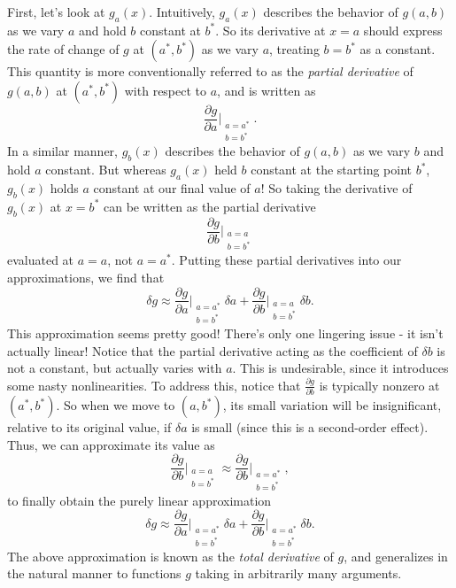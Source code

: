 \documentclass[letterpaper]{article}
\theoremstyle{remark}
\begin{document}
First, let's look at $g_a(x)$. Intuitively, $g_a(x)$ describes the behavior of $g(a, b)$ as we vary $a$ and hold $b$ constant at $b^*$. So its derivative at $x = a$ should express the rate of change of $g$ at $(a^*, b^*)$ as we vary $a$, treating $b = b^*$ as a constant. This quantity is more conventionally referred to as the \emph{partial derivative} of $g(a, b)$ at $(a^*, b^*)$ with respect to $a$, and is written as
\[
    \frac{\partial g}{\partial a}\Bigr|_{\substack{a=a^*\\b=b^*}}.
\]
In a similar manner, $g_b(x)$ describes the behavior of $g(a, b)$ as we vary $b$ and hold $a$ constant. But whereas $g_a(x)$ held $b$ constant at the starting point $b^*$, $g_b(x)$ holds $a$ constant at our final value of $a$! So taking the derivative of $g_b(x)$ at $x = b^*$ can be written as the partial derivative
\[
    \frac{\partial g}{\partial b}\Bigr|_{\substack{a=a\\b=b^*}}
\]
evaluated at $a = a$, not $a = a^*$.
Putting these partial derivatives into our approximations, we find that
\[
    \delta g \approx \frac{\partial g}{\partial a}\Bigr|_{\substack{a=a^*\\b=b^*}} \delta a + \frac{\partial g}{\partial b}\Bigr|_{\substack{a=a\\b=b^*}} \delta b.
\]
This approximation seems pretty good! There's only one lingering issue - it isn't actually linear! Notice that the partial derivative acting as the coefficient of $\delta b$ is not a constant, but actually varies with $a$. This is undesirable, since it introduces some nasty nonlinearities. To address this, notice that $\frac{\partial g}{\partial b}$ is typically nonzero at $(a^*, b^*)$. So when we move to $(a, b^*)$, its small variation will be insignificant, relative to its original value, if $\delta a$ is small (since this is a second-order effect). Thus, we can approximate its value as
\[
    \frac{\partial g}{\partial b}\Bigr|_{\substack{a=a\\b=b^*}} \approx \frac{\partial g}{\partial b}\Bigr|_{\substack{a=a^*\\b=b^*}},
\]
to finally obtain the purely linear approximation
\[
    \delta g \approx \frac{\partial g}{\partial a}\Bigr|_{\substack{a=a^*\\b=b^*}} \delta a + \frac{\partial g}{\partial b}\Bigr|_{\substack{a=a^*\\b=b^*}} \delta b.
\]
The above approximation is known as the \emph{total derivative} of $g$, and generalizes in the natural manner to functions $g$ taking in arbitrarily many arguments.
\end{document}
